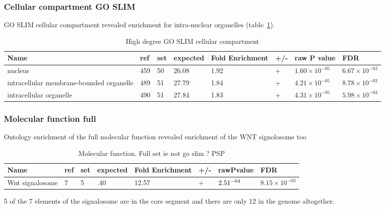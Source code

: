 \subsubsection{Cellular compartment GO SLIM}
GO SLIM cellular compartment revealed enrichment for intra-nuclear organelles (table~\ref{tab: high degree slim cellular compartment}).

\begin{table}
\centering
\begin{adjustbox}{max width=\textwidth}
\begin{tabular}{llllllll}
  Name  &ref &set &	expected &	Fold Enrichment &	+/-	&raw P value&FDR\\
\hline
nucleus &	459& 	50& 	26.08& 	1.92& 	+ &	$1.60\times 10^{-05}$& 	$6.67\times 10^{-03}$\\
intracellular membrane-bounded organelle&	489&	51&	27.79&	1.84&	+&	$4.21\times10^{-05}$ &	$8.78\times 10^{-03}$\\
intracellular organelle&	490&	51&	27.84&	1.83&	+&	$4.31\times 10^{-05}$&	$5.98\times10^{-03}$\\
\end{tabular}
\end{adjustbox}
\caption{High degree GO SLIM cellular compartment}
\label{tab: high degree slim cellular compartment}
\end{table}

\subsubsection{Molecular function full}
Ontology enrichment of the full molecular
 function revealed enrichment of the WNT signolosome too
\begin{table}
\centering
\begin{adjustbox}{max width=\textwidth}
\begin{tabular}{l l l l l l l l}
Name  &ref & set&	expected &	Fold Enrichment &	+/-	&rawPvalue&FDR\\
\hline
Wnt signalosome& 	7& 	5& 	.40& 	12.57&	+ &	$2.51\time10^{-04}$& 	$8.15\times10^{-03}$\\ 
\end{tabular}
\end{adjustbox}
\caption{Molecular function. Full set ie not go slim ? PSP}
\label{tab:Molecular function. Full set ie not go slim ? PSP}
\end{table}

5 of the 7 elements of the signalosome are in the core segment and there are only 12 in the genome altogether.

